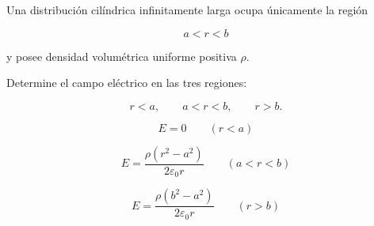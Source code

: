 \begin{ejercicio}

Una distribución cilíndrica infinitamente larga ocupa únicamente la región

\[
a<r<b
\]

y posee densidad volumétrica uniforme positiva \(\rho\).

\begin{center}
\end{center}

Determine el campo eléctrico en las tres regiones:

\[
r<a,\qquad
a<r<b,\qquad
r>b.
\]

\end{ejercicio}

\begin{respuesta}

\[
\boxed{E=0\qquad(r<a)}
\]

\[
\boxed{
E=
\frac{\rho(r^2-a^2)}{2\varepsilon_0r}
\qquad(a<r<b)
}
\]

\[
\boxed{
E=
\frac{\rho(b^2-a^2)}{2\varepsilon_0r}
\qquad(r>b)
}
\]

\end{respuesta}

